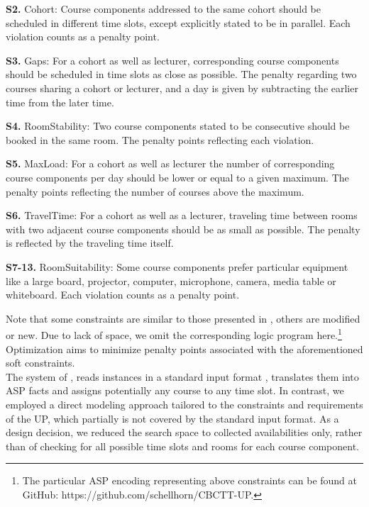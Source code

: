 \documentclass{easychair}
\newcommand{\UP}{UP}
\newcommand{\ASP}{ASP}
\begin{document}
  \textbf{S2.} Cohort: Course components addressed to the same cohort should be scheduled in different time slots, except explicitly stated to be in parallel. Each violation counts as a penalty point. 

  \textbf{S3.} Gaps: For a cohort as well as lecturer, corresponding course components should be scheduled in time slots as close as possible. The penalty regarding two courses sharing a cohort or lecturer, and a day is given by subtracting the earlier time from the later time. 

  \textbf{S4.} RoomStability: Two course components stated to be consecutive should be booked in the same room. The penalty points reflecting each violation. 

  \textbf{S5.} MaxLoad: For a cohort as well as lecturer the number of corresponding course components per day should be lower or equal to a given maximum. The penalty points reflecting the number of courses above the maximum. 

  \textbf{S6.} TravelTime: For a cohort as well as a lecturer, traveling time between rooms with two adjacent course components should be as small as possible. The penalty is reflected by the traveling time itself. 

  \textbf{S7-13.} RoomSuitability: Some course components prefer particular equipment like a large board, projector, computer, microphone, camera, media table or whiteboard. Each violation counts as a penalty point. 

  Note that some constraints are similar to those presented in \cite{bainkaokscsotawa18a}, others are modified or new.
  Due to lack of space, we omit the corresponding logic program here.\footnote{The particular \ASP{} encoding representing above constraints can be found at GitHub: https://github.com/schellhorn/CBCTT-UP.} 
  Optimization aims to minimize penalty points associated with the aforementioned soft constraints. \\
  The system of \cite{bainkaokscsotawa18a}, reads instances in a standard input format \cite{bocegasc12a}, translates them into \ASP{} facts and assigns potentially any course to any time slot. 
  In contrast, we employed a direct modeling approach tailored to the constraints and requirements of the \UP{}, which partially is not covered by the standard input format. 
  As a design decision, we reduced the search space to collected availabilities only, rather than of checking for all possible time slots and rooms for each course component.
\end{document}
